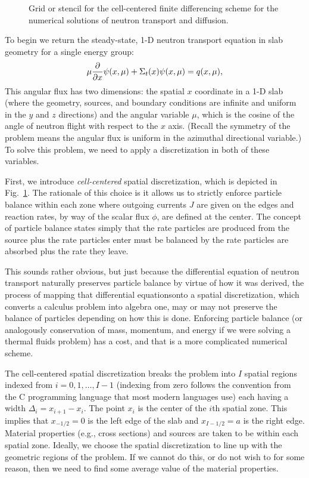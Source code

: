 \begin{figure}[tb!]
\begin{center}
\begin{tikzpicture}[scale=0.75]
\end{tikzpicture}
\caption{Grid or stencil for the cell-centered finite differencing scheme for the numerical solutions of neutron transport and diffusion.}
\label{Fig:neutronics_finiteDifferenceStencil}
\end{center}
\end{figure}

To begin we return the steady-state, 1-D neutron transport equation in slab geometry for a single energy group:
\begin{align}
  \mu \dho{}{x} \psi(x,\mu) + \Sigma_t(x) \psi(x,\mu) = q(x,\mu) ,
\end{align}
This angular flux has two dimensions: the spatial $x$ coordinate in a 1-D slab (where the geometry, sources, and boundary conditions are infinite and uniform in the $y$ and $z$ directions) and the angular variable $\mu$, which is the cosine of the angle of neutron flight with respect to the $x$ axis. (Recall the symmetry of the problem means the angular flux is uniform in the azimuthal directional variable.) To solve this problem, we need to apply a discretization in both of these variables.

First, we introduce \emph{cell-centered} spatial discretization, which is depicted in Fig.~\ref{Fig:neutronics_finiteDifferenceStencil}. The rationale of this choice is it allows us to strictly enforce particle balance within each zone where outgoing currents $J$ are given on the edges and reaction rates, by way of the scalar flux $\phi$, are defined at the center. The concept of particle balance states simply that the rate particles are produced from the source plus the rate particles enter must be balanced by the rate particles are absorbed plus the rate they leave. 

This sounds rather obvious, but just because the differential equation of neutron transport naturally preserves particle balance by virtue of how it was derived, the process of mapping that differential equationsonto a spatial discretization, which converts a calculus problem into algebra one, may or may not preserve the balance of particles depending on how this is done. Enforcing particle balance (or analogously conservation of mass, momentum, and energy if we were solving a thermal fluids problem) has a cost, and that is a more complicated numerical scheme.

The cell-centered spatial discretization breaks the problem into $I$ spatial regions indexed from $i = 0, 1, \ldots, I-1$ (indexing from zero follows the convention from the C programming language that most modern languages use) each having a width $\Delta_i = x_{i+1} - x_i$. The point $x_i$ is the center of the $i$th spatial zone. This implies that $x_{-1/2} = 0$ is the left edge of the slab and $x_{I-1/2} = a$ is the right edge. Material properties (e.g., cross sections) and sources are taken to be within each spatial zone. Ideally, we choose the spatial discretization to line up with the geometric regions of the problem. If we cannot do this, or do not wish to for some reason, then we need to find some average value of the material properties.





